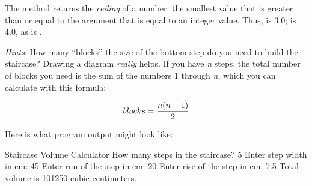 \begin{exercise}
The  method returns the {\em ceiling} of a number: the smallest value that is greater than or equal to the argument that is equal to an integer value.  Thus,  is 3.0;  is 4.0, as is .

{\em Hints}: How many ``blocks'' the size of the bottom step do you need to build the staircase? Drawing a diagram {\em really} helps. If you have {\em n} steps, the total number of blocks you need is the sum of the numbers 1 through {\em n}, which you can calculate with this formula: 

\begin{equation*}
blocks = {{n(n+1)}\over 2}
\end{equation*}

Here is what program output might look like:

\begin{stdout}
Staircase Volume Calculator
How many steps in the staircase? 5
Enter step width in cm: 45
Enter run of the step in cm: 20
Enter rise of the step in cm: 7.5
Total volume is 101250 cubic centimeters.
\end{stdout}
\end{exercise}


